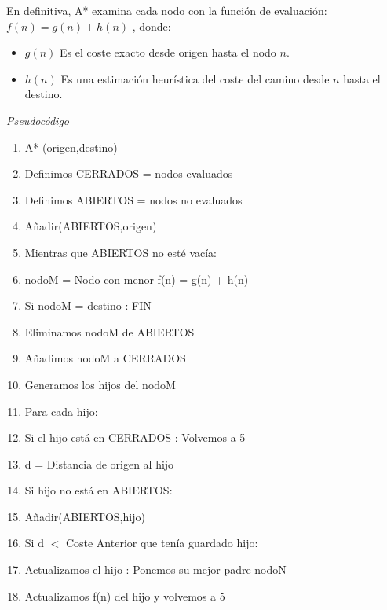 \documentclass[conference]{IEEEtran}
\begin{document}
{En definitiva, A* examina cada nodo con la función de evaluación: $f(n) = g(n) + h(n)$ , donde:
\begin{itemize}
\item $g(n)$ Es el coste exacto desde origen hasta el nodo $n$.
\item $h(n)$ Es una estimación heurística del coste del camino desde $n$ hasta el destino.
\end{itemize}
\begin{center}
\textit{Pseudocódigo}
\end{center}
\begin{enumerate}
\item A* (origen,destino)
\item \hspace{0.05cm} Definimos CERRADOS = nodos evaluados
\item \hspace{0.05cm} Definimos ABIERTOS = nodos no evaluados
\item \hspace{0.05cm} Añadir(ABIERTOS,origen)
\item \hspace{0.05cm} Mientras que ABIERTOS no esté vacía:
\item \hspace{0.1cm} nodoM = Nodo con menor f(n) = g(n) + h(n)
\item \hspace{0.1cm} Si nodoM = destino : FIN
\item \hspace{0.15cm} Eliminamos nodoM de ABIERTOS
\item \hspace{0.15cm} Añadimos nodoM a CERRADOS
\item \hspace{0.15cm} Generamos los hijos del nodoM
\item \hspace{0.15cm} Para cada hijo:
\item \hspace{0.2cm} Si el hijo está en CERRADOS : Volvemos a 5
\item \hspace{0.25cm} d = Distancia de origen al hijo
\item \hspace{0.25cm} Si hijo no está en ABIERTOS:
\item \hspace{0.35cm} Añadir(ABIERTOS,hijo)
\item \hspace{0.25cm} Si d $<$ Coste Anterior que tenía guardado hijo:
\item \hspace{0.3cm} Actualizamos el hijo : Ponemos su mejor padre nodoN
\item \hspace{0.3cm} Actualizamos f(n) del hijo y volvemos a 5
\end{enumerate}

}
\end{document}
